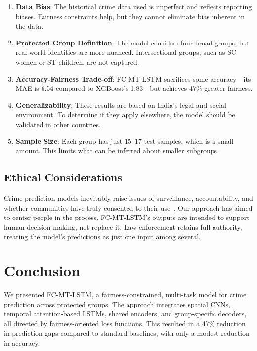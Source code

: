 \documentclass[conference]{IEEEtran}
\begin{document}
\begin{enumerate}
    \item \textbf{Data Bias}: The historical crime data used is imperfect and reflects reporting biases. Fairness constraints help, but they cannot eliminate bias inherent in the data.
    \item \textbf{Protected Group Definition}: The model considers four broad groups, but real-world identities are more nuanced. Intersectional groups, such as SC women or ST children, are not captured.
    \item \textbf{Accuracy-Fairness Trade-off}: FC-MT-LSTM sacrifices some accuracy---its MAE is 6.54 compared to XGBoost's 1.83---but achieves 47\% greater fairness.
    \item \textbf{Generalizability}: These results are based on India's legal and social environment. To determine if they apply elsewhere, the model should be validated in other countries.
    \item \textbf{Sample Size}: Each group has just 15--17 test samples, which is a small amount. This limits what can be inferred about smaller subgroups.
\end{enumerate}

\subsection{Ethical Considerations}

Crime prediction models inevitably raise issues of surveillance, accountability, and whether communities have truly consented to their use~\cite{barocas2016big}. Our approach has aimed to center people in the process. FC-MT-LSTM's outputs are intended to support human decision-making, not replace it. Law enforcement retains full authority, treating the model's predictions as just one input among several.

\section{Conclusion}

We presented FC-MT-LSTM, a fairness-constrained, multi-task model for crime prediction across protected groups. The approach integrates spatial CNNs, temporal attention-based LSTMs, shared encoders, and group-specific decoders, all directed by fairness-oriented loss functions. This resulted in a 47\% reduction in prediction gaps compared to standard baselines, with only a modest reduction in accuracy.
\end{document}
